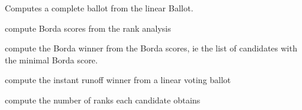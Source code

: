 \documentclass[letterpaper,10pt,english]{sphinxmanual}
\begin{document}
\begin{fulllineitems}
\begin{fulllineitems}
\label{techDoc:votingDigraphs.LinearVotingProfile.computeBallot}
Computes a complete ballot from the linear Ballot.

\end{fulllineitems}


\begin{fulllineitems}
\label{techDoc:votingDigraphs.LinearVotingProfile.computeBordaScores}
compute Borda scores from the rank analysis

\end{fulllineitems}


\begin{fulllineitems}
\label{techDoc:votingDigraphs.LinearVotingProfile.computeBordaWinners}
compute the Borda winner from the Borda scores, ie the list of
candidates with the minimal Borda score.

\end{fulllineitems}


\begin{fulllineitems}
\label{techDoc:votingDigraphs.LinearVotingProfile.computeInstantRunoffWinner}
compute the instant runoff winner from a linear voting ballot

\end{fulllineitems}


\begin{fulllineitems}
\label{techDoc:votingDigraphs.LinearVotingProfile.computeRankAnalysis}
compute the number of ranks each candidate obtains

\end{fulllineitems}



\end{fulllineitems}
\end{document}
